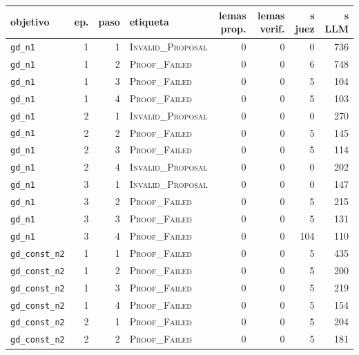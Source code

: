 \documentclass[11pt,a4paper]{article}
\begin{document}
\begin{table}[!ht]
\centering
\footnotesize
\setlength{\tabcolsep}{4pt}
\begin{tabular}{@{}lrrlrrrr@{}}
\toprule
objetivo & ep. & paso & etiqueta & lemas prop. & lemas verif. & s juez & s LLM \\
\midrule
\texttt{gd\_\allowbreak{}n1} & 1 & 1 & \textsc{Invalid\_Proposal} & 0 & 0 & 0 & 736 \\
\texttt{gd\_\allowbreak{}n1} & 1 & 2 & \textsc{Proof\_Failed} & 0 & 0 & 6 & 748 \\
\texttt{gd\_\allowbreak{}n1} & 1 & 3 & \textsc{Proof\_Failed} & 0 & 0 & 5 & 104 \\
\texttt{gd\_\allowbreak{}n1} & 1 & 4 & \textsc{Proof\_Failed} & 0 & 0 & 5 & 103 \\
\texttt{gd\_\allowbreak{}n1} & 2 & 1 & \textsc{Invalid\_Proposal} & 0 & 0 & 0 & 270 \\
\texttt{gd\_\allowbreak{}n1} & 2 & 2 & \textsc{Proof\_Failed} & 0 & 0 & 5 & 145 \\
\texttt{gd\_\allowbreak{}n1} & 2 & 3 & \textsc{Proof\_Failed} & 0 & 0 & 5 & 114 \\
\texttt{gd\_\allowbreak{}n1} & 2 & 4 & \textsc{Invalid\_Proposal} & 0 & 0 & 0 & 202 \\
\texttt{gd\_\allowbreak{}n1} & 3 & 1 & \textsc{Invalid\_Proposal} & 0 & 0 & 0 & 147 \\
\texttt{gd\_\allowbreak{}n1} & 3 & 2 & \textsc{Proof\_Failed} & 0 & 0 & 5 & 215 \\
\texttt{gd\_\allowbreak{}n1} & 3 & 3 & \textsc{Proof\_Failed} & 0 & 0 & 5 & 131 \\
\texttt{gd\_\allowbreak{}n1} & 3 & 4 & \textsc{Proof\_Failed} & 0 & 0 & 104 & 110 \\
\texttt{gd\_\allowbreak{}const\_\allowbreak{}n2} & 1 & 1 & \textsc{Proof\_Failed} & 0 & 0 & 5 & 435 \\
\texttt{gd\_\allowbreak{}const\_\allowbreak{}n2} & 1 & 2 & \textsc{Proof\_Failed} & 0 & 0 & 5 & 200 \\
\texttt{gd\_\allowbreak{}const\_\allowbreak{}n2} & 1 & 3 & \textsc{Proof\_Failed} & 0 & 0 & 5 & 219 \\
\texttt{gd\_\allowbreak{}const\_\allowbreak{}n2} & 1 & 4 & \textsc{Proof\_Failed} & 0 & 0 & 5 & 154 \\
\texttt{gd\_\allowbreak{}const\_\allowbreak{}n2} & 2 & 1 & \textsc{Proof\_Failed} & 0 & 0 & 5 & 204 \\
\texttt{gd\_\allowbreak{}const\_\allowbreak{}n2} & 2 & 2 & \textsc{Proof\_Failed} & 0 & 0 & 5 & 181 \\

\end{tabular}
\end{table}
\end{document}
